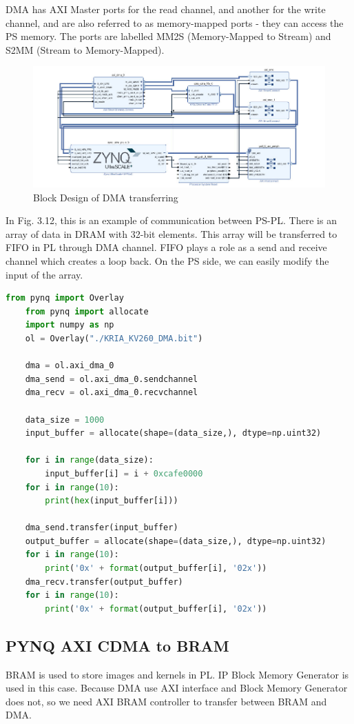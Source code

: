\documentclass[a4paper, 12pt]{report}
\begin{document}
DMA has AXI Master ports for the read channel, and another for the write channel, and are also referred to as memory-mapped ports - they can access the PS memory. The ports are labelled MM2S (Memory-Mapped to Stream) and S2MM (Stream to Memory-Mapped). 
\begin{figure}[H]
    \centering
    \includegraphics[width = 18cm]{picture/dma/z3976842715300_efb45c6db2d11f0ef02b16d20527631b.jpg}
    \caption{Block Design of DMA transferring}
    \medskip
\end{figure}
In Fig. 3.12, this is an example of communication between PS-PL. There is an array of data in DRAM with 32-bit elements. This array will be transferred to FIFO in PL through DMA channel. FIFO plays a role as a send and receive channel which creates a loop back. On the PS side, we can easily modify the input of the array.
\begin{lstlisting}[language = Python]
    from pynq import Overlay
    from pynq import allocate
    import numpy as np
    ol = Overlay("./KRIA_KV260_DMA.bit")

    dma = ol.axi_dma_0
    dma_send = ol.axi_dma_0.sendchannel
    dma_recv = ol.axi_dma_0.recvchannel

    data_size = 1000
    input_buffer = allocate(shape=(data_size,), dtype=np.uint32)

    for i in range(data_size):
        input_buffer[i] = i + 0xcafe0000
    for i in range(10):
        print(hex(input_buffer[i]))

    dma_send.transfer(input_buffer)
    output_buffer = allocate(shape=(data_size,), dtype=np.uint32)
    for i in range(10):
        print('0x' + format(output_buffer[i], '02x'))
    dma_recv.transfer(output_buffer)
    for i in range(10):
        print('0x' + format(output_buffer[i], '02x'))
\end{lstlisting}
\subsection{PYNQ AXI CDMA to BRAM}
BRAM is used to store images and kernels in PL. IP Block Memory Generator is used in this case. Because DMA use AXI interface and Block Memory Generator does not, so we need AXI BRAM controller to transfer between BRAM and DMA.
\end{document}
